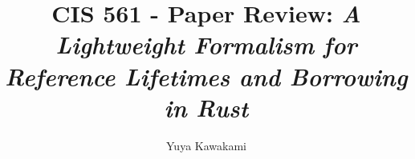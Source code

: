 \renewcommand\footnotetextcopyrightpermission[1]{} %


\newenvironment{tightItemize}{
    \begin{itemize}
        \setlength{\itemsep}{1pt}
        \setlength{\parskip}{0pt}
        \setlength{\parsep}{0pt}
}{\end{itemize}
}

\usepackage{graphicx}
\usepackage{svg}
\usepackage{minted}
\usepackage{listings}
\usepackage{minted}

\newcommand{\rs}[1]{\texttt{#1}}



\usepackage[ruled,vlined]{algorithm2e}

\usepackage{multirow}
\usepackage{multicol}
\usepackage{makecell}

\usepackage{tikz} %
\usepackage{pgfplots}


\fancyfoot{}



\title{CIS 561 - Paper Review: \textit{A Lightweight Formalism for Reference Lifetimes and Borrowing in Rust}}

\author{Yuya Kawakami}


\maketitle
\pagestyle{empty}
\thispagestyle{empty}

